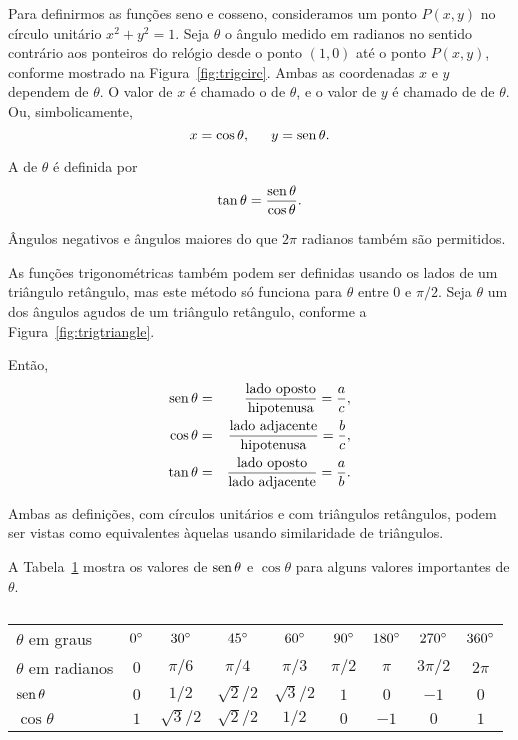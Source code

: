 
Para definirmos as funções seno e cosseno, consideramos um ponto $P(x, y)$
no círculo unitário $x^2 + y^2 = 1$. Seja $\theta$ o ângulo medido em radianos
no sentido contrário aos ponteiros do relógio desde o ponto $(1, 0)$ até o
ponto $P(x, y)$, conforme mostrado na Figura~\ref{fig:trigcirc}. Ambas as
coordenadas $x$ e $y$ dependem de $\theta$. O valor de $x$ é chamado o
 de $\theta$, e o valor de $y$ é chamado de 
de $\theta$. Ou, simbolicamente,
$$
  x = \cos \theta, \hspace{1.5em} y = \operatorname{sen} \theta.
$$


A  de $\theta$ é definida por
$$
  \tan \theta = \frac{\operatorname{sen} \theta}{\cos \theta}.
$$

Ângulos negativos e ângulos maiores do que $2\pi$ radianos também são
permitidos.

As funções trigonométricas também podem ser definidas usando os lados de um
triângulo retângulo, mas este método só funciona para $\theta$ entre $0$ e
$\pi/2$. Seja $\theta$ um dos ângulos agudos de um triângulo retângulo,
conforme a Figura~\ref{fig:trigtriangle}.


Então,
\begin{eqnarray*}
  \operatorname{sen} \theta & = & \frac{\text{lado oposto}}{\text{hipotenusa}} =
    \frac{a}{c}, \\
  \cos \theta & = & \frac{\text{lado adjacente}}{\text{hipotenusa}} =
    \frac{b}{c}, \\
  \tan \theta & = & \frac{\text{lado oposto}}{\text{lado adjacente}} =
    \frac{a}{b}.
\end{eqnarray*}

Ambas as definições, com círculos unitários e com triângulos retângulos,
podem ser vistas como equivalentes àquelas usando similaridade de triângulos.

A Tabela~\ref{tab:trigvalues} mostra os valores de $\operatorname{sen} \theta$ e
$\cos \theta$ para alguns valores importantes de $\theta$.

\begin{table}
\caption{}
\label{tab:trigvalues}
\begingroup
\setlength{\tabcolsep}{1em}
\def\SP{\hspace{1em}}
\begin{tabular}{l|c|c|c|c|c|c|c|c}
\hline
$\theta$ em graus & $0\degree$ & $30\degree$ & $45\degree$ & $60\degree$ &
  $90\degree$ & $180\degree$ & $270\degree$ & $360\degree$ \\
$\theta$ em radianos & $0$     & $\pi/6$     & $\pi/4$     & $\pi/3$     &
  $\pi/2$     & $\pi$        & $3\pi/2$     & $2\pi$ \\
$\operatorname{sen} \theta$ & $0$ & $1/2$ & $\sqrt{2}/2$ & $\sqrt{3}/2$ & $1$ & $0$ & $-1$ &
  $0$ \\
$\cos \theta$ & $1$ & $\sqrt{3}/2$ & $\sqrt{2}/2$ & $1/2$ & $0$ & $-1$ & $0$ &
  $1$ \\
\hline
\end{tabular}
\endgroup
\end{table}

